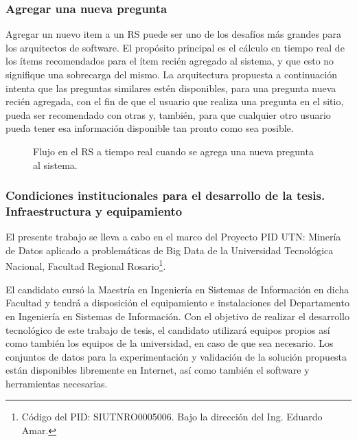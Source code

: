 \subsubsection{Agregar una nueva pregunta}
Agregar un nuevo item a un RS puede ser uno de los desafíos más grandes para los arquitectos de software. El propósito principal es el cálculo en tiempo real de los ítems recomendados para el ítem recién agregado al sistema, y que esto no signifique una sobrecarga del mismo. La arquitectura propuesta a continuación intenta que las preguntas similares estén disponibles, para una pregunta nueva recién agregada, con el fin de que el usuario que realiza una pregunta en el sitio, pueda ser recomendado con otras y, también, para que cualquier otro usuario pueda tener esa información disponible tan pronto como sea posible.

\begin{figure}
	\def\svgwidth{\linewidth}
	
	\caption{Flujo en el RS a tiempo real cuando se agrega una nueva pregunta al sistema.}
\end{figure}

\subsubsection{Condiciones institucionales para el desarrollo de la tesis. Infraestructura y equipamiento}
El presente trabajo se lleva a cabo en el marco del Proyecto PID UTN: Minería de Datos aplicado a problemáticas de Big Data de la Universidad Tecnológica Nacional, Facultad Regional Rosario\footnote{Código del PID: SIUTNRO0005006. Bajo la dirección del Ing. Eduardo Amar.}.

\bigskip El candidato cursó la Maestría en Ingeniería en Sistemas de Información en dicha Facultad y tendrá a disposición el equipamiento e instalaciones del Departamento en Ingeniería en Sistemas de Información. Con el objetivo de realizar el desarrollo tecnológico de este trabajo de tesis, el candidato utilizará equipos propios así como también los equipos de la universidad, en caso de que sea necesario. Los conjuntos de datos para la experimentación y validación de la solución propuesta están disponibles libremente en Internet, así como también el software y herramientas necesarias.

















